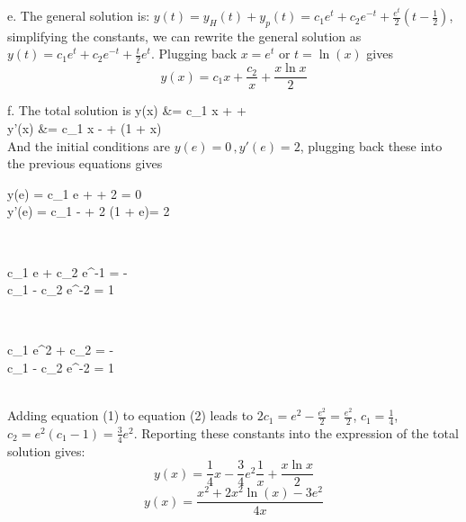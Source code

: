 \documentclass[12pt,twoside]{article}
\begin{document}
\item [e.] The general solution is: $y(t) =  y_H(t) + y_p(t) = c_1 e^t + c_2 e^{-t} + \frac{e^t}{2} (t - \frac{1}{2})$, simplifying the constants,
we can rewrite the general solution as $y(t) =  c_1 e^t + c_2 e^{-t} + \frac{t}{2} e^t$.
Plugging back $x=e^t$ or $t=\ln(x)$ gives 
\[
	y(x) = c_1 x + \frac{c_2}{x} + \frac{x \ln x}{ 2}
\]

\item [f.]
The total solution is
\ba
	y(x) 	&= c_1 x +  +  \\
	y'(x) 	&= c_1 x -  +  (1 + \ln x) \\
\ea
And the initial conditions are $y(e) = 0 \, , y'(e) = 2$, plugging back these into the previous equations gives 
\ba
	\begin{cases}
	y(e) = c_1 e +  +  {2} = 0 \\
	y'(e) = c_1 -  +  {2} (1 +  \ln e)= 2 \\
	\end{cases} \\	
\ea
\ba
	\Rightarrow 
	\begin{cases}
	c_1 e + c_2 e^{-1}  = -  \\
	c_1 - c_2 e^{-2} = 1 \\
	\end{cases} \\	
\ea
\ba
	\Rightarrow 
	\begin{cases}
	c_1 e^2 + c_2  = -  \\
	c_1 - c_2 e^{-2} = 1 \\
	\end{cases} \\	
\ea
Adding equation (1) to equation (2) leads to $2 c_1 = e^2 - \frac{e^2}{2} =  \frac{e^2}{2}$,  $c_1=\frac{1}{4}$,$c_2 = e^2 (c_1-1) = \frac{3}{4} e^2$. 
Reporting these constants into the expression of the total solution gives:
\[
	y(x) = \frac{1}{4} x -  \frac{3}{4} e^2 \frac{1}{x} + \frac{x \ln x}{2} 
\]
\[
	y(x) = \frac{x^2 + 2 x^2 \ln(x) - 3 e^2} { 4 x} 
\]

\ee
\end{document}
